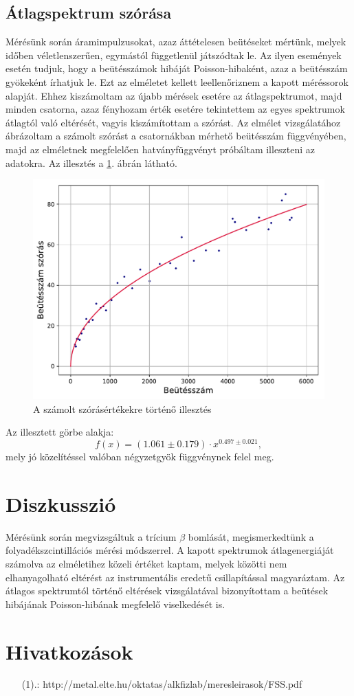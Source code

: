 \documentclass[12pt,a4paper]{article}
\begin{document}
\subsection{Átlagspektrum szórása}
\hspace*{10pt} Mérésünk során áramimpulzusokat, azaz áttételesen beütéseket mértünk, melyek időben véletlenszerűen, egymástól függetlenül játszódtak le. Az ilyen események esetén tudjuk, hogy a beütésszámok hibáját Poisson-hibaként, azaz a beütésszám gyökeként írhatjuk le. Ezt az elméletet kellett leellenőriznem a kapott méréssorok alapját. Ehhez kiszámoltam az újabb mérések esetére az átlagspektrumot, majd minden csatorna, azaz  fényhozam érték esetére tekintettem az egyes spektrumok átlagtól való eltérését, vagyis kiszámítottam a szórást. Az elmélet vizsgálatához ábrázoltam a számolt szórást a csatornákban mérhető beütésszám függvényében, majd az elméletnek megfelelően hatványfüggvényt próbáltam illeszteni az adatokra. Az illesztés a \ref{fig:3}. ábrán látható.\\
\begin{figure}[!h]
\centering
\includegraphics[width=0.8\linewidth]{poiss}
\caption{A számolt szórásértékekre történő illesztés}
\label{fig:3}
\end{figure}
\newline
\hspace*{10pt} Az illesztett görbe alakja:
$$ f(x)= (1.061 \pm 0.179) \cdot x ^{0.497 \pm 0.021}, $$
mely jó közelítéssel valóban négyzetgyök függvénynek felel meg.

\newpage
\section{Diszkusszió}
\hspace*{10pt} Mérésünk során megvizsgáltuk a trícium $\beta$ bomlását, megismerkedtünk a folyadékszcintillációs mérési módszerrel. A kapott spektrumok átlagenergiáját számolva az elméletihez közeli értéket kaptam, melyek közötti nem elhanyagolható eltérést az instrumentális eredetű csillapítással magyaráztam. Az átlagos spektrumtól történő eltérések vizsgálatával bizonyítottam a beütések hibájának Poisson-hibának megfelelő viselkedését is.

\section*{Hivatkozások}
\begin{itemize}
\item[(1).:] {http://metal.elte.hu/oktatas/alkfizlab/meresleirasok/FSS.pdf}

\end{itemize}
\end{document}
